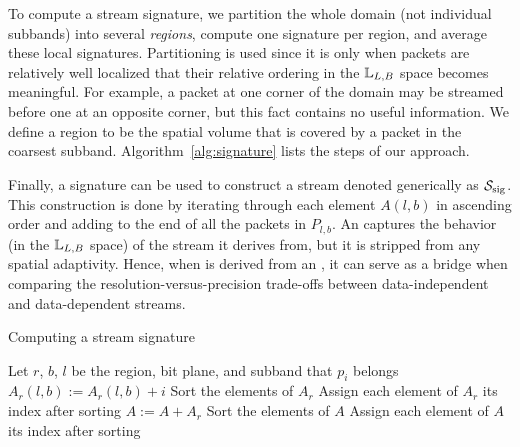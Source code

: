 To compute a stream signature, we partition the whole domain (not individual subbands) into several
\emph{regions}, compute one signature per region, and average these local signatures. Partitioning
is used since it is only when packets are relatively well localized that their relative ordering in
the ${\mathbb L}_{L,B}$ space becomes meaningful. For example, a packet at one corner of the domain may
be streamed before one at an opposite corner, but this fact contains no useful information. We
define a region to be the spatial volume that is covered by a packet in the coarsest subband.
Algorithm~\ref{alg:signature} lists the steps of our approach.

Finally, a signature can be used to construct a stream denoted generically as $\ssig$. This
construction is done by iterating through each element $A(l,b)$ in ascending order and adding to the
end of \ssig all the packets in $P_{l,b}$. An \ssig captures the behavior (in the ${\mathbb L}_{L,B}$
space) of the stream it derives from, but it is stripped from any spatial adaptivity. Hence, when
\ssig is derived from an \sopt, it can serve as a bridge when comparing the
resolution-versus-precision trade-offs between data-independent and data-dependent streams.

\vspace{-0.5em}
\begin{algorithm}[h]
  \caption{Computing a stream signature}
  \begin{algorithmic}[1]
			\State Let $r$, $b$, $l$ be the region, bit plane, and subband that $p_i$ belongs
			\State $A_r(l,b) := A_r(l,b)+i$
		\EndFor
			\State Sort the elements of $A_r$
			\State Assign each element of $A_r$ its index after sorting
			\State $A := A+A_r$
		\EndFor
		\State Sort the elements of $A$
		\State Assign each element of $A$ its index after sorting
	\end{algorithmic}
	\label{alg:signature}
\end{algorithm}
\vspace{-0.5em}
